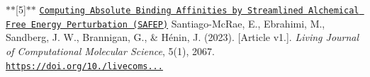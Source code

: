 \label{md_lambda-abf_doxygen_ref5}%
\hypertarget{md_lambda-abf_doxygen_ref5}{}%
$\ast$$\ast$\mbox{[}5\mbox{]}$\ast$$\ast$ \href{https://livecomsjournal.org/index.php/livecoms/article/view/v5i1e2067}{\tt Computing Absolute Binding Affinities by Streamlined Alchemical Free Energy Perturbation (S\-A\-F\-E\-P)} Santiago-\/\-Mc\-Rae, E., Ebrahimi, M., Sandberg, J. W., Brannigan, G., \& Hénin, J. (2023). \mbox{[}Article v1.\mbox{]}. {\itshape Living Journal of Computational Molecular Science}, 5(1), 2067. \href{https://doi.org/10.33011/livecoms.5.1.2067}{\tt https\-://doi.\-org/10./livecoms...} 
